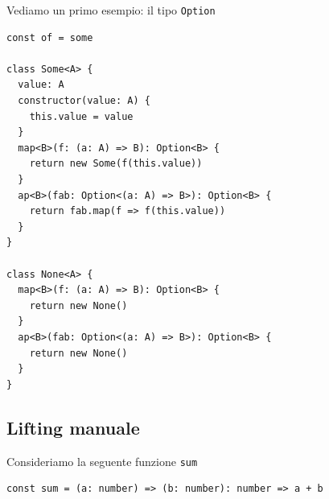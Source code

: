 \documentclass[12pt]{article}
\begin{document}
Vediamo un primo esempio: il tipo \texttt{Option}

\begin{verbatim}
const of = some

class Some<A> {
  value: A
  constructor(value: A) {
    this.value = value
  }
  map<B>(f: (a: A) => B): Option<B> {
    return new Some(f(this.value))
  }
  ap<B>(fab: Option<(a: A) => B>): Option<B> {
    return fab.map(f => f(this.value))
  }
}

class None<A> {
  map<B>(f: (a: A) => B): Option<B> {
    return new None()
  }
  ap<B>(fab: Option<(a: A) => B>): Option<B> {
    return new None()
  }
}
\end{verbatim}










\subsection{Lifting manuale}

Consideriamo la seguente funzione \texttt{sum}

\begin{verbatim}
const sum = (a: number) => (b: number): number => a + b
\end{verbatim}
\end{document}
